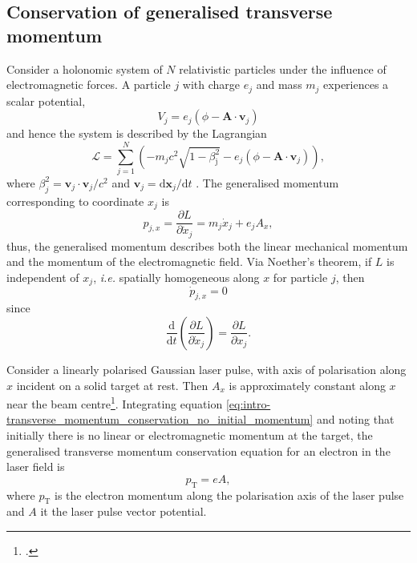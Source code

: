 \subsection{Conservation of generalised transverse momentum}\label{sec:intro_conservation-generalised-mometum}
Consider a holonomic system of $N$ relativistic particles under the influence of electromagnetic forces. A particle $j$ with charge $e_j$ and mass $m_j$ experiences a scalar potential,
\begin{equation}
		V_{j} = e_j(\phi - \mathbf{A} \cdot \mathbf{v}_{j})
\end{equation}
and hence the system is described by the Lagrangian
\begin{equation}
	\mathcal{L} = \sum^N_{j=1}\left( - m_jc^2\sqrt{1-\beta^2_\mathrm{j}} - e_j(\phi - \mathbf{A} \cdot \mathbf{v}_j) \right),
\end{equation}
where $\beta^2_j = \mathbf{v}_{j}\cdot\mathbf{v}_{j} /c^2$ and $\mathbf{v}_j = \mathrm{d}\mathbf{x}_j/\mathrm{d}t$ \cite{goldsteinClassicalMechanics2013}.
The generalised momentum corresponding to coordinate $x_j$ is
\begin{equation}
	p_{j,x} = \frac{\partial L}{\partial \dot{x}_j} = m_j\dot{x}_j + e_jA_x,
\end{equation}
thus, the generalised momentum describes both the linear mechanical momentum and the momentum of the electromagnetic field. Via Noether's theorem, if $L$ is independent of $x_j$, \textit{i.e.} spatially homogeneous along $x$ for particle $j$, then 
\begin{equation}\label{eq:intro-transverse_momentum_differential_equation}
	\dot{p}_{j,x} = 0
\end{equation}
since
\begin{equation}
	\frac{\mathrm{d}}{\mathrm{d}t}\left(\frac{\partial L}{\partial \dot{x}_j}\right) = \frac{\partial L}{\partial x_j}.
\end{equation}

Consider a linearly polarised Gaussian laser pulse, with axis of polarisation along $x$ incident on a solid target at rest. Then $A_x$ is approximately constant along $x$ near the beam centre\footcite{Constant relative to the scale of typical electron trajectories in such an interaction.}. Integrating equation \ref{eq:intro-transverse_momentum_conservation_no_initial_momentum} and noting that initially there is no linear or electromagnetic momentum at the target, the generalised transverse momentum conservation equation for an electron in the laser field is
\begin{equation}\label{eq:intro-transverse_momentum_conservation_no_initial_momentum}
	p_\mathrm{T} = eA,
\end{equation}
where $p_\mathrm{T}$ is the electron momentum along the polarisation axis of the laser pulse and $A$ it the laser pulse vector potential.


